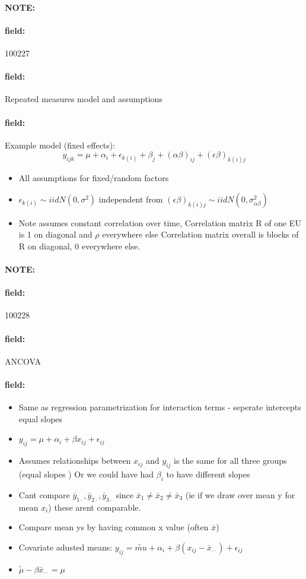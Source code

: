 \documentclass[12pt]{article}
\newenvironment{note}{\paragraph{NOTE:}}{}
\newenvironment{field}{\paragraph{field:}}{}
\begin{document}
\begin{note}
    \begin{field}
        \tiny 100227
    \end{field}
    \begin{field}
        Repeated measures model and assumptions
    \end{field}
    \begin{field}
      Example model (fixed effects):
      $$y_{ijk} = \mu + \alpha_i + \epsilon_{k(i)} + \beta_j + (\alpha\beta)_{ij} + (\epsilon\beta)_{k(i)j} $$
      \begin{itemize}
        \item All assumptions for fixed/random factors
        \item $\epsilon_{k(i)} \sim iid N(0,\sigma^2)$ independent from $(\epsilon\beta)_{k(i)j} \sim iid N(0,\sigma_{\alpha\beta}^2)$
        \item Note assumes constant correlation over time, Correlation matrix R of one EU is 1 on diagonal and $\rho$ everywhere else Correlation matrix overall is blocks of R on diagonal, 0 everywhere else.
      \end{itemize}
    \end{field}
\end{note}


\begin{note}
    \begin{field}
        \tiny 100228
    \end{field}
    \begin{field}
        ANCOVA
    \end{field}
    \begin{field}
        \begin{itemize}
          \item Same as regression parametrization for interaction terms - seperate intercepts equal slopes
          \item $y_{ij} = \mu + \alpha_i + \beta x_{ij} + \epsilon_{ij}$
          \item Assumes relationships between $x_{ij}$ and $y_{ij}$ is the same for all three groups (equal slopes ) Or we could have had $\beta_i$ to have different slopes
          \item Cant compare $\bar{y}_{1 \cdot}, \bar{y}_{2 \cdot},\bar{y}_{3 \cdot}$ since $\bar{x}_1 \neq \bar{x}_2 \neq \bar{x}_3$ (ie if we draw over mean y for mean $x_i$) these arent comparable.
          \item Compare mean ys by having common x value (often $\bar{x}$)
          \item Covariate adusted means: $y_{ij} = \tilde{mu} + \alpha_i + \beta(x_{ij} - \bar{x}_{\cdot\cdot}) + \epsilon_{ij}$
          \item $\tilde{\mu} - \beta\bar{x}_{\cdot\cdot} = \mu$
        \end{itemize}
    \end{field}
\end{note}

\end{document}
